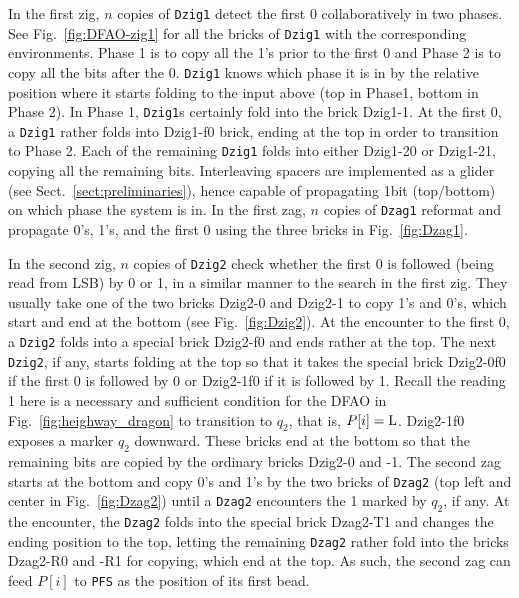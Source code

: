 \documentclass[runningheads]{llncs}
\begin{document}
In the first zig, $n$ copies of \texttt{Dzig1} detect the first 0 collaboratively in two phases. 
See Fig.~\ref{fig:DFAO-zig1} for all the bricks of \texttt{Dzig1} with the corresponding environments. 
Phase 1 is to copy all the 1's prior to the first 0 and Phase 2 is to copy all the bits after the 0. 
\texttt{Dzig1} knows which phase it is in by the relative position where it starts folding to the input above (top in Phase1, bottom in Phase 2). 
In Phase 1, \texttt{Dzig1}s certainly fold into the brick Dzig1-1. 
At the first 0, a \texttt{Dzig1} rather folds into Dzig1-f0 brick, ending at the top in order to transition to Phase 2. 
Each of the remaining \texttt{Dzig1} folds into either Dzig1-20 or Dzig1-21, copying all the remaining bits. 
Interleaving spacers are implemented as a glider (see Sect.~\ref{sect:preliminaries}), hence capable of propagating 1bit (top/bottom) on which phase the system is in. 
In the first zag, $n$ copies of \texttt{Dzag1} reformat and propagate 0's, 1's, and the first 0 using the three bricks in Fig.~\ref{fig:Dzag1}.

In the second zig, $n$ copies of \texttt{Dzig2} check whether the first 0 is followed (being read from LSB) by 0 or 1, in a similar manner to the search in the first zig. 
They usually take one of the two bricks Dzig2-0 and Dzig2-1 to copy 1's and 0's, which start and end at the bottom (see Fig.~\ref{fig:Dzig2}).
At the encounter to the first 0, a \texttt{Dzig2} folds into a special brick Dzig2-f0 and ends rather at the top. 
The next \texttt{Dzig2}, if any, starts folding at the top so that it takes the special brick Dzig2-0f0 if the first 0 is followed by 0 or Dzig2-1f0 if it is followed by 1. 
Recall the reading 1 here is a necessary and sufficient condition for the DFAO in Fig.~\ref{fig:heighway_dragon} to transition to $q_2$, that is, $P[i] = {\rm L}$. 
Dzig2-1f0 exposes a marker $q_2$ downward. 
These bricks end at the bottom so that the remaining bits are copied by the ordinary bricks Dzig2-0 and -1. 
The second zag starts at the bottom and copy 0's and 1's by the two bricks of \texttt{Dzag2} (top left and center in Fig.~\ref{fig:Dzag2}) until a \texttt{Dzag2} encounters the 1 marked by $q_2$, if any. 
At the encounter, the \texttt{Dzag2} folds into the special brick Dzag2-T1 and changes the ending position to the top, letting the remaining \texttt{Dzag2} rather fold into the bricks Dzag2-R0 and -R1 for copying, which end at the top. 
As such, the second zag can feed $P[i]$ to \texttt{PFS} as the position of its first bead. 
\end{document}
